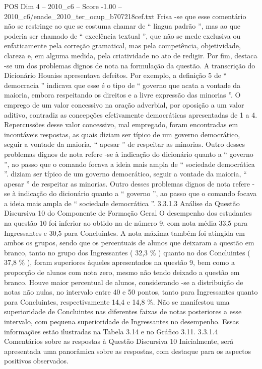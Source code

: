 \begin{textsample}{POS Dim 4 – 2010\_c6 – Score -1.00 – 2010\_c6/enade\_2010\_ter\_ocup\_b707218cef.txt}
Frisa -se que esse comentário não se restringe ao que se costuma chamar de “ língua padrão ”, mas ao que poderia ser chamado de “ excelência textual ”, que não se mede exclusiva ou enfaticamente pela correção gramatical, mas pela competência, objetividade, clareza e, em alguma medida, pela criatividade no ato de redigir.
Por fim, destaca -se um dos problemas dignos de nota na formulação da questão.
A transcrição do Dicionário Houaiss apresentava defeitos.
Por exemplo, a definição 5 de “ democracia ” indicava que esse é o tipo de “ governo que acata a vontade da maioria, embora respeitando os direitos e a livre expressão das minorias ”.
O emprego de um valor concessivo na oração adverbial, por oposição a um valor aditivo, contradiz as concepções efetivamente democráticas apresentadas de 1 a 4.
Repercussões desse valor concessivo, mal empregado, foram encontradas em incontáveis respostas, as quais diziam ser típico de um governo democrático, seguir a vontade da maioria, “ apesar ” de respeitar as minorias.
Outro desses problemas dignos de nota refere -se à indicação do dicionário quanto a “ governo ”, ao passo que o comando focava a ideia mais ampla de “ sociedade democrática ”. diziam ser típico de um governo democrático, seguir a vontade da maioria, “ apesar ” de respeitar as minorias.
Outro desses problemas dignos de nota refere -se à indicação do dicionário quanto a “ governo ”, ao passo que o comando focava a ideia mais ampla de “ sociedade democrática ”. 3.3.1.3 Análise da Questão Discursiva 10 do Componente de Formação Geral O desempenho dos estudantes na questão 10 foi inferior ao obtido na de número 9, com nota média 33,5 para Ingressantes e 30,5 para Concluintes.
A nota máxima também foi atingida em ambos os grupos, sendo que os percentuais de alunos que deixaram a questão em branco, tanto no grupo dos Ingressantes ( 32,3 \% ) quanto no dos Concluintes ( 37,8 \% ), foram superiores àqueles apresentados na questão 9, bem como a proporção de alunos com nota zero, mesmo não tendo deixado a questão em branco.
Houve maior percentual de alunos, considerando -se a distribuição de notas não nulas, no intervalo entre 40 e 50 pontos, tanto para Ingressantes quanto para Concluintes, respectivamente 14,4 e 14,8 \%.
Não se manifestou uma superioridade de Concluintes nas diferentes faixas de notas posteriores a esse intervalo, com pequena superioridade de Ingressantes no desempenho.
Essas informações estão ilustradas na Tabela 3.14 e no Gráfico 3.11. 3.3.1.4 Comentários sobre as respostas à Questão Discursiva 10 Inicialmente, será apresentada uma panorâmica sobre as respostas, com destaque para os aspectos positivos observados.

\end{textsample}
